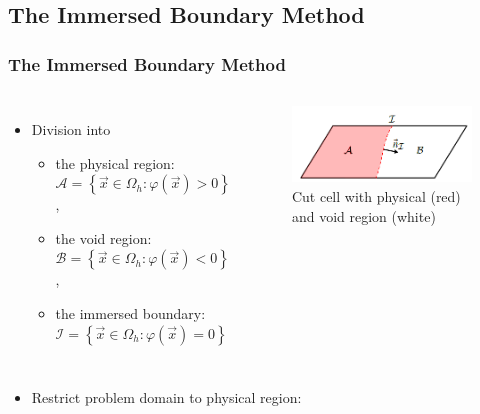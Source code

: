 
	\subsection{The Immersed Boundary Method}
	\begin{frame}
		\frametitle{The Immersed Boundary Method}
		\begin{columns}[t]
			\column[]{7cm}
			\vspace{-0.5cm}
			\begin{itemize}
				\item Division into
					\begin{itemize}
						\item the physical region:  $\mathcal{A} = \left\{\vec{x} \in \Omega_h : \varphi (\vec{x}) > 0 \right\}$,
						\item the void region:  $\mathcal{B} = \left\{ \vec{x}\in \Omega_h : \varphi (\vec{x}) < 0 \right\}$, 
						\item the immersed boundary: $\mathcal{I} = \left\{ \vec{x}\in \Omega_h : \varphi (\vec{x}) = 0 \right\}$
					\end{itemize} 
			\end{itemize}
			\column[]{5cm}
			\onslide
			\begin{figure}[htbp]
				\vspace{-1cm}
				\includegraphics[width=\textwidth]{img/ibmcut.PNG}
				\caption{Cut cell with physical (red) and void region (white) \cite{paper}}\label{fig:cutcell}
			\end{figure} 
		\end{columns}
		\pause
		\begin{itemize}
			\item Restrict problem domain to physical region:
		\end{itemize}
		\vspace{-0.3cm}
		\scalebox{0.9}{
			\begin{minipage}{\the\textwidth}			

\end{minipage}}
\end{frame}
